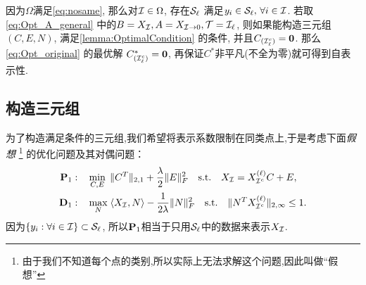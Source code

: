 因为\(\Omega\)满足\eqref{eq:nosame},   那么对\(\mathcal{I}\in \Omega\),
存在\(\mathcal{S}_\ell\) 满足\(y_i \in \mathcal{S}_\ell, \, \forall i \in \mathcal{I}\). 
若取\eqref{eq:Opt_A_general} 中的\(B=X_{\mathcal{I}}, A=X_{\mathcal{I}\rightarrow 0}, \mathcal{T}=\mathcal{I}_\ell\),
则如果能构造三元组\((C,E,N)\), 满足\autoref{lemma:OptimalCondition} 的条件,
并且\(C_{(\mathcal{I}_\ell^c)}=\mathbf{0}\). 那么\eqref{eq:Opt_original} 的最优解
\(C^*_{(\mathcal{I}_\ell^c)}=\mathbf{0}\), 再保证\(C^*\)非平凡(不全为零)就可得到自表示性.

\subsection{构造三元组}\label{sec:construct_nu}
为了构造满足条件的三元组,我们希望将表示系数限制在同类点上,于是考虑下面\emph{假想}
\footnote{由于我们不知道每个点的类别,所以实际上无法求解这个问题,因此叫做``假想''}
的优化问题及其对偶问题：
\begin{align}\label{eq:Opt_fictitious2}
  \mathbf{P}_1: \quad &\min_{C, E} \;
  \|C^T\|_{2,1}+\frac{\lambda}{2}\|E\|_F^2 \quad
  \text{s.t.} \quad X_{\mathcal{I}}=X^{(\ell)}_{\mathcal{I}^c}C+E,\\
  \mathbf{D}_1: \quad &\max_{N} \; \langle X_{\mathcal{I}}, N\rangle -
  \frac{1}{2\lambda} \|N\|_F^2 \quad
  \text{s.t.} \quad \|N^T X^{(\ell)}_{\mathcal{I}^c}\|_{2, \infty} \leq 1.
  \label{eq:dual_fictitious2}
\end{align}
因为\(\left\{y_i : \forall i \in \mathcal{I} \right\}\subset \mathcal{S}_\ell\),
所以\(\mathbf{P}_1\)相当于只用\(\mathcal{S}_\ell\)中的数据来表示\(X_{\mathcal{I}}\).

